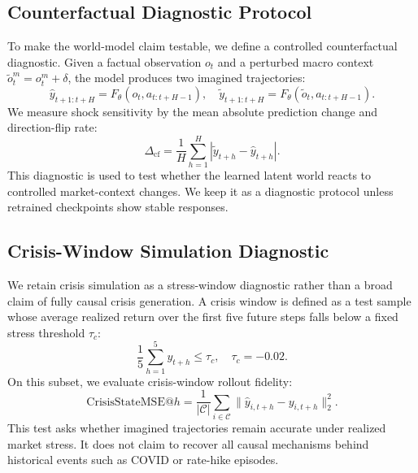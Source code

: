 \documentclass[letterpaper]{article}
\begin{document}
\subsection{Counterfactual Diagnostic Protocol}
To make the world-model claim testable, we define a controlled counterfactual diagnostic. Given a factual observation $o_t$ and a perturbed macro context $\tilde{o}_t^{m}=o_t^{m}+\delta$, the model produces two imagined trajectories:
\begin{equation}
    \hat{y}_{t+1:t+H}=F_\theta(o_t,a_{t:t+H-1}),
    \quad
    \tilde{y}_{t+1:t+H}=F_\theta(\tilde{o}_t,a_{t:t+H-1}).
\end{equation}
We measure shock sensitivity by the mean absolute prediction change and direction-flip rate:
\begin{equation}
    \Delta_{\mathrm{cf}} =
    \frac{1}{H}\sum_{h=1}^{H}
    |\tilde{y}_{t+h}-\hat{y}_{t+h}|.
\end{equation}
This diagnostic is used to test whether the learned latent world reacts to controlled market-context changes. We keep it as a diagnostic protocol unless retrained checkpoints show stable responses.

\subsection{Crisis-Window Simulation Diagnostic}
We retain crisis simulation as a stress-window diagnostic rather than a broad claim of fully causal crisis generation. A crisis window is defined as a test sample whose average realized return over the first five future steps falls below a fixed stress threshold $\tau_c$:
\begin{equation}
    \frac{1}{5}\sum_{h=1}^{5} y_{t+h} \leq \tau_c,
    \quad \tau_c=-0.02.
\end{equation}
On this subset, we evaluate crisis-window rollout fidelity:
\begin{equation}
    \mathrm{CrisisStateMSE}@h =
    \frac{1}{|\mathcal{C}|}\sum_{i\in\mathcal{C}}
    \|\hat{y}_{i,t+h}-y_{i,t+h}\|_2^2.
\end{equation}
This test asks whether imagined trajectories remain accurate under realized market stress. It does not claim to recover all causal mechanisms behind historical events such as COVID or rate-hike episodes.
\end{document}

